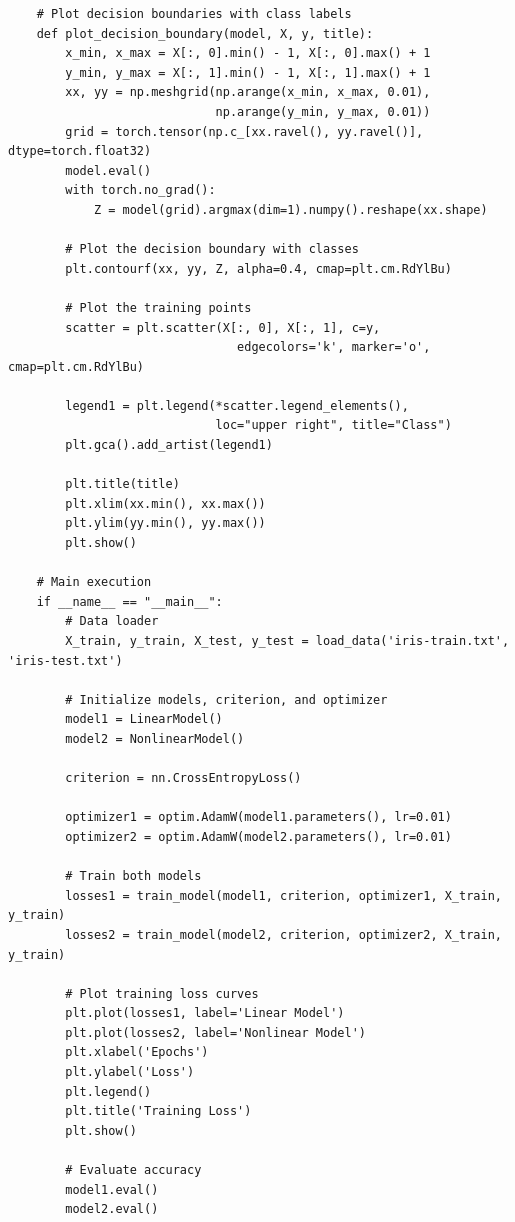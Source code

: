 \documentclass[11pt, oneside]{article}   	%
\begin{document}
\begin{verbatim}
    # Plot decision boundaries with class labels
    def plot_decision_boundary(model, X, y, title):
        x_min, x_max = X[:, 0].min() - 1, X[:, 0].max() + 1
        y_min, y_max = X[:, 1].min() - 1, X[:, 1].max() + 1
        xx, yy = np.meshgrid(np.arange(x_min, x_max, 0.01),
                             np.arange(y_min, y_max, 0.01))
        grid = torch.tensor(np.c_[xx.ravel(), yy.ravel()], dtype=torch.float32)
        model.eval()
        with torch.no_grad():
            Z = model(grid).argmax(dim=1).numpy().reshape(xx.shape)
        
        # Plot the decision boundary with classes
        plt.contourf(xx, yy, Z, alpha=0.4, cmap=plt.cm.RdYlBu)
        
        # Plot the training points
        scatter = plt.scatter(X[:, 0], X[:, 1], c=y, 
                                edgecolors='k', marker='o', cmap=plt.cm.RdYlBu)
        
        legend1 = plt.legend(*scatter.legend_elements(),
                             loc="upper right", title="Class")
        plt.gca().add_artist(legend1)
        
        plt.title(title)
        plt.xlim(xx.min(), xx.max())
        plt.ylim(yy.min(), yy.max())
        plt.show()
    
    # Main execution
    if __name__ == "__main__":
        # Data loader
        X_train, y_train, X_test, y_test = load_data('iris-train.txt', 'iris-test.txt')
        
        # Initialize models, criterion, and optimizer
        model1 = LinearModel()
        model2 = NonlinearModel()
        
        criterion = nn.CrossEntropyLoss()
        
        optimizer1 = optim.AdamW(model1.parameters(), lr=0.01)
        optimizer2 = optim.AdamW(model2.parameters(), lr=0.01)
        
        # Train both models
        losses1 = train_model(model1, criterion, optimizer1, X_train, y_train)
        losses2 = train_model(model2, criterion, optimizer2, X_train, y_train)
        
        # Plot training loss curves
        plt.plot(losses1, label='Linear Model')
        plt.plot(losses2, label='Nonlinear Model')
        plt.xlabel('Epochs')
        plt.ylabel('Loss')
        plt.legend()
        plt.title('Training Loss')
        plt.show()
        
        # Evaluate accuracy
        model1.eval()
        model2.eval()
        

\end{verbatim}
\end{document}
